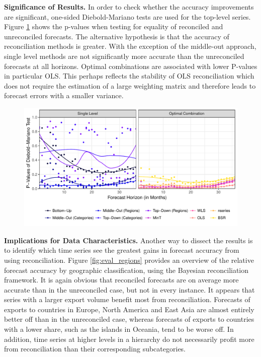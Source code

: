 \documentclass[a4paper,fleqn,11pt]{article}
\begin{document}
\noindent\textbf{Significance of Results.} In order to check whether the accuracy improvements are significant, one-sided Diebold-Mariano tests are used for the top-level series. Figure \ref{fig:dmtest} shows the p-values when testing for equality of reconciled and unreconciled forecasts. The alternative hypothesis is that the accuracy of reconciliation methods is greater. With the exception of the middle-out approach, single level methods are not significantly more accurate than the unreconciled forecasts at all horizons. Optimal combinations are associated with lower P-values in particular OLS. This perhaps reflects the stability of OLS reconciliation which does not require the estimation of a large weighting matrix and therefore leads to forecast errors with a smaller variance.

\begin{figure}[H]
	\includegraphics[width=\textwidth]{fig/fig_dm}
	\label{fig:dmtest}
\end{figure}

\noindent\textbf{Implications for Data Characteristics.} Another way to dissect the results is to identify which time series see the greatest gains in forecast accuracy from using reconciliation. Figure \ref{fig:eval_regions} provides an overview of the relative forecast accuracy by geographic classification, using the Bayesian reconciliation framework. It is again obvious that reconciled forecasts are on average more accurate than in the unreconciled case, but not in every instance. It appears that series with a larger export volume benefit most from reconciliation. Forecasts of exports to countries in Europe, North America and East Asia are almost entirely better off than in the unreconciled case, whereas forecasts of exports to countries with a lower share, such as the islands in Oceania, tend to be worse off. In addition, time series at higher levels in a hierarchy do not necessarily profit more from reconciliation than their corresponding subcategories.
\end{document}
